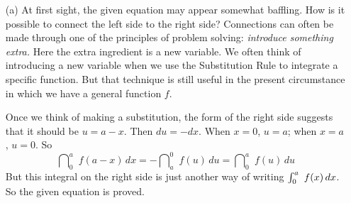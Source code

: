 \documentclass{sebase}
\begin{document}
\begin{Solution}
\thinspace

\begin{enumerate}
\item[(a)] 
At first sight,
the given equation may appear somewhat baffling. How is it possible to
connect the left side to the right side? Connections can often be made
through one of the principles of problem solving: \textit{introduce
something extra.} Here the extra ingredient is a new variable. We often
think of introducing a new variable when we use the Substitution Rule to
integrate a specific function. But that technique is still useful in the
present circumstance in which we have a general function $f$.

\quad Once we think of making a substitution, the form of the right side
suggests that it should be $u=a-x$. Then $du=-dx$. When $x=0$, $u=a$; when $%
x=a$, $u=0$. So 
\begin{equation*}
\dint\nolimits_{0}^{a}\,\,f(a-x)\,dx=-\dint\nolimits_{a}^{0}\,\,f(u)\,du=%
\dint\nolimits_{0}^{a}\,\,f(u)\,du
\end{equation*}
But this integral on the right side is just another way of writing $%
\tint\nolimits_{0}^{a}\,\,f(x)\,dx$. So the given equation is proved.


\end{enumerate}
\end{Solution}
\end{document}
